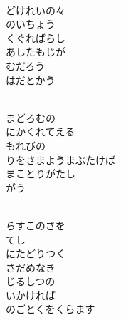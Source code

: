 \documentclass[10pt,b5j]{tarticle} %
\begin{document}
\vspace{1.5em} %
\newcommand{\linespace}{0.5em} %
\newcommand{\blocksize}{0.5\hsize} %
\newcommand{\itemmargin}{3em} %
\begin{enumerate} %
    \setlength{\itemindent}{\itemmargin} %
    \begin{minipage}[c]{\blocksize}
    
        \vspace{\linespace}
        \item~\\
        どけれいの々\\
        のいちょう\\
        くぐればらし\\
        あしたもじが\\
        むだろう\\
        はだとかう
        
    \end{minipage}
    \begin{minipage}[c]{\blocksize}
        
        \vspace{\linespace}
        \item~\\
        まどろむの\\
        にかくれてえる\\
        もれびの\\
        りをさまようまぶたけば\\
        まことりがたし\\
        がう
        
    \end{minipage}
    \begin{minipage}[c]{\blocksize}
        
        \vspace{\linespace}
        \item~\\
        らすこのさを\\
        てし\\
        にたどりつく\\
        さだめなき\\
        じるしつの\\
        いかければ\\
        のごとくをくらます
        

\end{minipage}
\end{enumerate}
\end{document}
